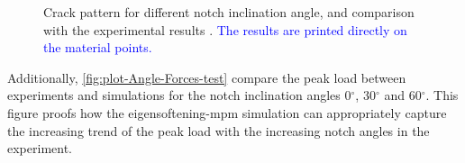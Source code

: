 \documentclass[preprint,12pt,a4paper]{elsarticle}
\begin{document}
\begin{figure}
\centering
{}
\caption{Crack pattern for different notch inclination angle, and
  comparison with the experimental results  \cite{LIM_1993}. \textcolor{blue}{The results are printed directly on the material points.}}
\label{fig:Figure-Angle-Forces-test-damage-pattern}
\end{figure}
Additionally, \ref{fig:plot-Angle-Forces-test} compare the peak load
between experiments and simulations for the notch inclination angles
0$^{\circ}$, 30$^{\circ}$ and 60$^{\circ}$. This figure proofs how the
eigensoftening-\acrshort{mpm} simulation can appropriately capture the
increasing trend of the peak load with the increasing notch angles in
the experiment.
\end{document}
